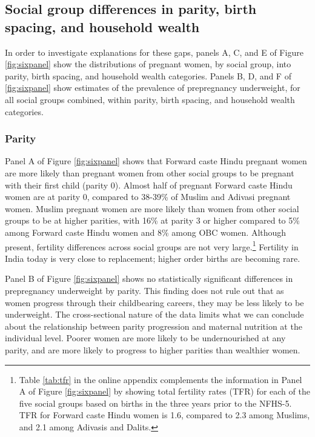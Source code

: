 \documentclass[12pt]{article}
\begin{document}
\subsection*{Social group differences in parity, birth spacing, and household wealth}

In order to investigate explanations for these gaps, panels A, C, and E of Figure \ref{fig:sixpanel} show the distributions of pregnant women, by social group, into parity, birth spacing, and household wealth categories.  Panels B, D, and F of \ref{fig:sixpanel} show estimates of the prevalence of prepregnancy underweight, for all social groups combined, within parity, birth spacing, and household wealth categories.  

\subsubsection*{Parity}

Panel A of Figure \ref{fig:sixpanel} shows that Forward caste Hindu pregnant women are more likely than pregnant women from other social groups to be pregnant with their first child (parity 0). Almost half of pregnant Forward caste Hindu women are at parity 0, compared to 38-39\% of Muslim and Adivasi pregnant women. Muslim pregnant women are more likely than women from other social groups to be at higher parities, with 16\% at parity 3 or higher compared to 5\% among Forward caste Hindu women and 8\% among OBC women. Although present, fertility differences across social groups are not very large.\footnote{Table \ref{tab:tfr} in the online appendix complements the information in Panel A of Figure \ref{fig:sixpanel} by showing total fertility rates (TFR) for each of the five social groups based on births in the three years prior to the NFHS-5.  TFR for Forward caste Hindu women is 1.6, compared to 2.3 among Muslims, and 2.1 among Adivasis and Dalits.}  Fertility in India today is very close to replacement; higher order births are becoming rare.

Panel B of Figure \ref{fig:sixpanel} shows no statistically significant differences in prepregnancy underweight by parity. This finding does not rule out that as women progress through their childbearing careers, they may be less likely to be underweight.  The cross-sectional nature of the data limits what we can conclude about the relationship between parity progression and maternal nutrition at the individual level.  Poorer women are more likely to be undernourished at any parity, and are more likely to progress to higher parities than wealthier women.  
\end{document}
